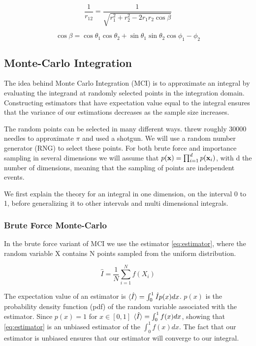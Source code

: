 \begin{equation}
  \label{eq:distance_spherical}
  \frac{1}{r_{12}} = \frac{1}{\sqrt{r_1^2 + r_2^2 - 2r_1r_2 \cos{\beta}}}
\end{equation}

\begin{equation}
  \label{eq:cos_beta}
  \cos{\beta} = \cos{\theta_1} \cos{\theta_2} + \sin{\theta_1} \sin{\theta_2}
  \cos{\phi_1 -\phi_2}
\end{equation}

\subsection{Monte-Carlo Integration}

The idea behind Monte Carlo Integration (MCI) is to approximate an integral by
evaluating the integrand at randomly selected points in the integration domain.
Constructing estimators that have expectation value equal to the integral
ensures that the variance of our estimations decreases as the sample size increases.

The random points can be selected in many different ways. \cite{needle} threw
roughly 30000 needles to approximate $\pi$ and \cite{shotgun} used a shotgun.
We will use a random number generator (RNG) to select these points.
For both brute force and importance sampling in several dimensions we will
assume that $p(\mathbf{x}) = \prod_{i=1}^{d} p(\mathbf{x}_i)$, with d the number of dimensions,
meaning that the sampling of points are independent events.

We first explain the theory for an integral in one dimension, on the interval 0 to 1,
before generalizing it to other intervals and multi dimensional integrals.

\subsubsection{Brute Force Monte-Carlo}

In the brute force variant of MCI we use the estimator \cref{eq:estimator},
where the random variable X contains N points sampled from the uniform distribution.

\begin{equation}
  \label{eq:estimator}
  \hat{I} = \frac{1}{N}\sum_{i=1}^{N} f(X_i)
\end{equation}

The expectation value of an estimator is $\braket{\hat{I}} = \int_{0}^{1}
\hat{I}p(x)dx$. $p(x)$ is the probability density function (pdf) of the random
variable associated with the estimator. Since $p(x) = 1 $ for $x \in [0,1]$
$\braket{\hat{I}} = \int_0^1 f(x) dx $, showing that \cref{eq:estimator} is an
unbiased estimator of the $\int_0^1 f(x) dx$. The fact that our estimator is
unbiased ensures that our estimator will converge to our integral.


